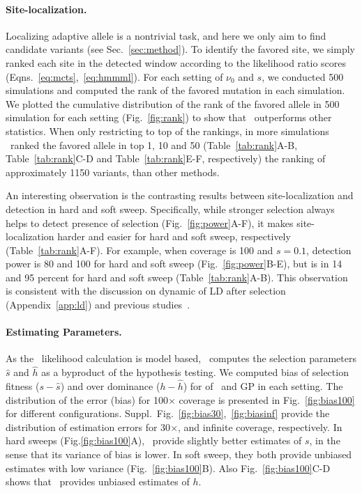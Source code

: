 \paragraph{Site-localization.}
Localizing adaptive allele is a nontrivial task, and here we only aim to find 
candidate variants (see Sec.~\ref{sec:method}). 
To identify the favored site, we simply ranked each site in the
detected window according to the likelihood ratio scores
(Eqns.~\ref{eq:mcts},~\ref{eq:hmmml}). For each setting of $\nu_0$ and $s$, 
we conducted 500 simulations and computed the rank of the favored 
mutation in each
simulation. 
We plotted the cumulative distribution of the rank of the favored allele in 500 
simulation for each setting (Fig.~\ref{fig:rank}) to show that \comale\ 
outperforms other statistics. 
When only restricting to top of the rankings, in more simulations \comale\ 
ranked the favored allele in top 1, 10 and 50 
(Table~\ref{tab:rank}A-B, Table~\ref{tab:rank}C-D and Table~\ref{tab:rank}E-F, 
respectively) the ranking of approximately 1150 variants, than other methods. 

An interesting observation is the contrasting results
between site-localization and detection in hard and soft sweep.
Specifically, while stronger selection always helps to detect presence of 
selection (Fig.~\ref{fig:power}A-F), it makes site-localization harder and 
easier for hard and soft sweep, respectively (Table~\ref{tab:rank}A-F).
For example, when coverage is 100 and $s=0.1$, detection power is 80 and 100 
for hard and soft sweep (Fig.~\ref{fig:power}B-E), but is in 14 and 95 percent 
for hard and soft sweep (Table~\ref{tab:rank}A-B).
This observation is consistent with the discussion on dynamic of LD after 
selection (Appendix~\ref{app:ld}) and previous 
studies~\cite{long2013massive,tobler2014massive}.
 
\paragraph{Estimating Parameters.}
As the \comale\ likelihood calculation is model based, \comale\
computes the selection parameters $\hat{s}$ and $\hat{h}$ as a byproduct of the 
hypothesis testing. We computed bias of selection fitness ($s-\hat{s}$) and 
over dominance ($h-\hat{h}$) for of \comale\ and GP in each setting. The 
distribution of
the error (bias) for 100$\times$ coverage is presented in
Fig.~\ref{fig:bias100} for different configurations.
Suppl.~Fig.~\ref{fig:bias30},~\ref{fig:biasinf}
provide the distribution of estimation errors for 30$\times$, and infinite 
coverage, respectively.  In hard sweeps (Fig.\ref{fig:bias100}A), \comale\ 
provide slightly better estimates of $s$, in the sense that its variance of 
bias is lower. In soft sweep, they both provide unbiased estimates with low 
variance (Fig.~\ref{fig:bias100}B).
Also Fig.~\ref{fig:bias100}C-D shows that \comale\ provides unbiased estimates 
of $h$.

